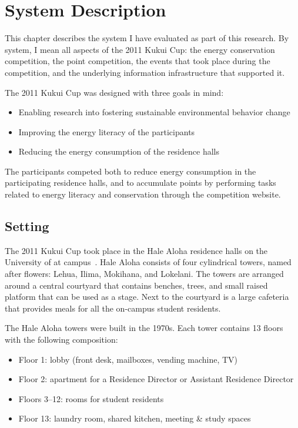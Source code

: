 \chapter{System Description}
\label{cha:system-description}

This chapter describes the system I have evaluated as part of this research. By system, I mean all aspects of the 2011 Kukui Cup: the energy conservation competition, the point competition, the events that took place during the competition, and the underlying information infrastructure that supported it.

The 2011 Kukui Cup was designed with three goals in mind:

\begin{itemize}
	\item Enabling research into fostering sustainable environmental behavior change
	\item Improving the energy literacy of the participants
	\item Reducing the energy consumption of the residence halls
\end{itemize}

The participants competed both to reduce energy consumption in the participating residence halls, and to accumulate points by performing tasks related to energy literacy and conservation through the competition website.

\section{Setting}
\label{sec:setting}

The 2011 Kukui Cup took place in the Hale Aloha residence halls on the University of \Hawaii at \Manoa campus~\cite{hale-aloha-website}. Hale Aloha consists of four cylindrical towers, named after \Hawaiian flowers: Lehua, Ilima, Mokihana, and Lokelani. The towers are arranged around a central courtyard that contains benches, trees, and small raised platform that can be used as a stage. Next to the courtyard is a large cafeteria that provides meals for all the on-campus student residents.

The Hale Aloha towers were built in the 1970s. Each tower contains 13 floors with the following composition:

\begin{itemize}
	\item Floor 1: lobby (front desk, mailboxes, vending machine, TV)
	\item Floor 2: apartment for a Residence Director or Assistant Residence Director
	\item Floors 3--12: rooms for student residents
	\item Floor 13: laundry room, shared kitchen, meeting \& study spaces
\end{itemize}

